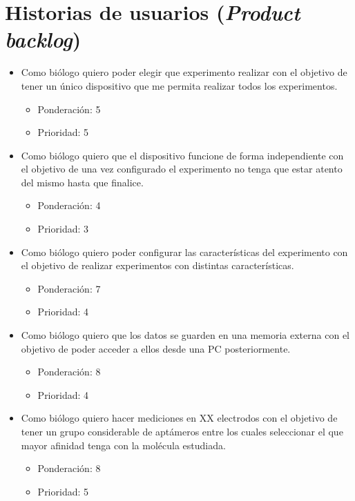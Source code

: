 \documentclass[11pt]{charter}
\begin{document}
\section{Historias de usuarios (\textit{Product backlog})}
\label{sec:backlog}


\begin{itemize}

\item Como biólogo quiero poder elegir que experimento realizar con el objetivo de tener un único dispositivo que me permita realizar todos los experimentos.
\begin{itemize}
\item Ponderación: 5
\item Prioridad: 5
\end{itemize}

\item Como biólogo quiero que el dispositivo funcione de forma independiente con el objetivo de una vez configurado el experimento no tenga que estar atento del mismo hasta que finalice.
\begin{itemize}
\item Ponderación: 4
\item Prioridad: 3
\end{itemize}

\item Como biólogo quiero poder configurar las características del experimento con el objetivo de realizar experimentos con distintas características.
\begin{itemize}
\item Ponderación: 7
\item Prioridad: 4
\end{itemize}

\item Como biólogo quiero que los datos se guarden en una memoria externa con el objetivo de poder acceder a ellos desde una PC posteriormente.
\begin{itemize}
\item Ponderación: 8 
\item Prioridad: 4
\end{itemize}

\item Como biólogo quiero hacer mediciones en XX electrodos con el objetivo de tener un grupo considerable de aptámeros entre los cuales seleccionar el que mayor afinidad tenga con la molécula estudiada.
\begin{itemize}
\item Ponderación: 8
\item Prioridad: 5
\end{itemize}


\end{itemize}
\end{document}
